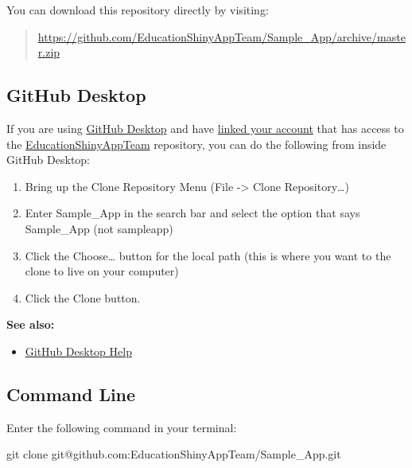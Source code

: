 \documentclass[
]{book}
\newenvironment{Shaded}{\begin{snugshade}}{\end{snugshade}}
\newcommand{\FunctionTok}[1]{\textcolor[rgb]{0.00,0.00,0.00}{#1}}
\newcommand{\NormalTok}[1]{#1}
\providecommand{\tightlist}{%
  \setlength{\itemsep}{0pt}\setlength{\parskip}{0pt}}
\begin{document}
You can download this repository directly by visiting:

\begin{quote}
\url{https://github.com/EducationShinyAppTeam/Sample_App/archive/master.zip}
\end{quote}

\hypertarget{github-desktop}{%
\subsection{GitHub Desktop}\label{github-desktop}}

If you are using \href{https://desktop.github.com/}{GitHub Desktop} and have \href{https://help.github.com/en/desktop/getting-started-with-github-desktop/authenticating-to-github}{linked your account} that has access to the \href{https://github.com/EducationShinyAppTeam}{EducationShinyAppTeam} repository, you can do the following from inside GitHub Desktop:

\begin{enumerate}
\def\labelenumi{\arabic{enumi}.}
\tightlist
\item
  Bring up the Clone Repository Menu (File -\textgreater{} Clone Repository\ldots)\\
\item
  Enter Sample\_App in the search bar and select the option that says Sample\_App (not sampleapp)
\item
  Click the Choose\ldots{} button for the local path (this is where you want to the clone to live on your computer)
\item
  Click the Clone button.
\end{enumerate}

\textbf{See also:}

\begin{itemize}
\tightlist
\item
  \href{https://help.github.com/en/desktop}{GitHub Desktop Help}
\end{itemize}

\hypertarget{command-line}{%
\subsection{Command Line}\label{command-line}}

Enter the following command in your terminal:

\begin{Shaded}
\begin{Highlighting}[]
\FunctionTok{git}\NormalTok{ clone git@github.com:EducationShinyAppTeam/Sample_App.git}
\end{Highlighting}
\end{Shaded}
\end{document}
